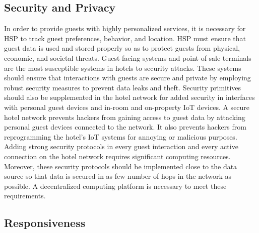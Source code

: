 \documentclass[10pt,journal,letterpaper]{IEEEtran}
\begin{document}
{%

\subsection*{Security and Privacy}

In order to provide guests with highly personalized services, it is necessary for HSP to track guest preferences, behavior, and location. HSP must ensure that guest data is used and stored properly so as to protect guests from physical, economic, and societal threats. Guest-facing systems and point-of-sale terminals are the most susceptible systems in hotels to security attacks. These systems should ensure that interactions with guests are secure and private by employing robust security measures to prevent data leaks and theft. Security primitives should also be supplemented in the hotel network for added security in interfaces with personal guest devices and in-room and on-property IoT devices. A secure hotel network prevents hackers from gaining access to guest data by attacking personal guest devices connected to the network. It also prevents hackers from reprogramming the hotel's IoT systems for annoying or malicious purposes. Adding strong security protocols in every guest interaction and every active connection on the hotel network requires significant computing resources. Moreover, these security protocols should be implemented close to the data source so that data is secured in as few number of hops in the network as possible. A decentralized computing platform is necessary to meet these requirements.


\subsection*{Responsiveness}

}
\end{document}
